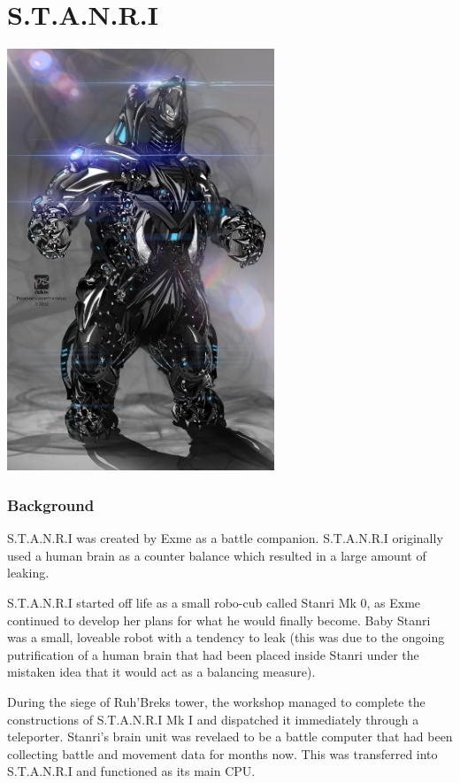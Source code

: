

\section{S.T.A.N.R.I}

\begin{center}
\includegraphics[width=80mm]{./content/img/stanriMecha.jpg}
\begin{figure}[h]
\end{figure}
\end{center}


\subsubsection{Background}

S.T.A.N.R.I was created by Exme as a battle companion.  S.T.A.N.R.I originally used a human brain as a counter balance which resulted in a large amount of leaking.    

S.T.A.N.R.I started off life as a small robo-cub called Stanri Mk 0, as Exme continued to develop her plans for what he would finally become.  Baby Stanri was a small, loveable robot with a tendency to leak (this was due to the ongoing putrification of a human brain that had been placed inside Stanri under the mistaken idea that it would act as a balancing measure).  

During the siege of Ruh'Breks tower, the workshop managed to complete the constructions of S.T.A.N.R.I Mk I and dispatched it immediately through a teleporter.  Stanri's brain unit was revelaed to be a battle computer that had been collecting battle and movement data for months now.  This was transferred into S.T.A.N.R.I and functioned as its main CPU.   

